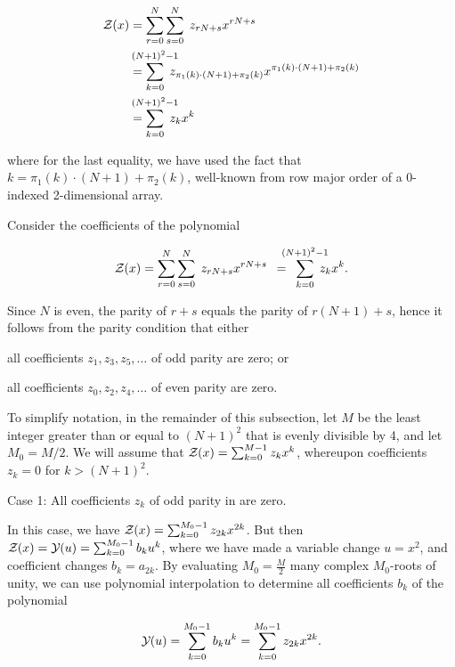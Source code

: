 \begin{align}
\label{eq:ffttwo:polyRecEvenN}
\begin{split}
\fullZx &= \sum_{r=0}^{N} \sum_{s=0}^{N}\; z_{rN+s} x^{rN+s} \\
&=
\sum_{k=0}^{\mathclap{(N+1)^2-1}}\; z_{\pi_1(k)\cdot (N+1) + \pi_2(k)}
x^{\pi_1(k)\cdot (N+1) + \pi_2(k)} \\
&=
\sum_{k=0}^{\mathclap{(N+1)^2-1}}\; z_k x^k
\end{split}
\end{align}

where for the last equality, we have used the fact that
$k = \pi_1(k)\cdot (N+1)+\pi_2(k)$, well-known from
row major order of a 0-indexed 2-dimensional array.

Consider the coefficients of the polynomial

\begin{align}
\label{eq:ffttwo:zOfXEvenN}
\fullZx = \sum_{r=0}^{N} \sum_{s=0}^{N}\; z_{rN+s} x^{rN+s}
\enspace=\enspace\sum_{k=0}^{\mathclap{(N+1)^2-1}}\; z_k x^k.
\end{align}

Since $N$ is even, the parity of $r+s$ equals the parity of
$r(N+1)+s$, hence  it follows from the parity condition that either
\begin{inparaenum}[\em 1\upshape)]
\item all coefficients $z_1,z_3,z_5,\dots$ of odd parity are zero;
or \item all coefficients $z_0,z_2,z_4,\dots$ of even parity are zero.
\end{inparaenum}
To simplify notation, in the remainder of this subsection, let $M$ be
the least integer greater than or equal to $(N+1)^2$ that is evenly divisible
by 4, and let $M_0=M/2$. We will assume that ${\mathcal Z}_{}(x) = \sum_{k=0}^{M-1}
z_k x^k$, whereupon coefficients $z_k=0$ for $k>(N+1)^2$.

\medskip
{\sc Case 1}: All coefficients $z_k$ of odd parity in
 are zero.
\smallskip

In this case, we have
${\mathcal Z}_{}(x) = \sum_{k=0}^{M_0-1} z_{2k} x^{2k}$. But then
${\mathcal Z}_{}(x) = {\mathcal Y}_{}(u) = \sum_{k=0}^{M_0-1} b_k u^k$,
where we have made a variable change $u=x^2$, and coefficient changes
$b_k = a_{2k}$.
By evaluating $M_0=\frac{M}{2}$ many complex
$M_0$-roots of unity, we can
use polynomial interpolation to determine all coefficients $b_k$ of
the polynomial

\begin{align}
{\mathcal Y}_{}(u) = \sum_{k=0}^{M_0-1} b_k u^k = \sum_{k=0}^{M_0-1} z_{2k} x^{2k}.
\end{align}

